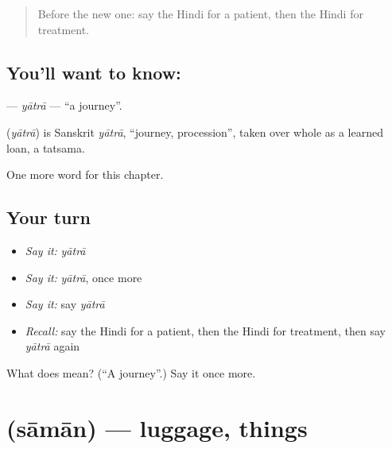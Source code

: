 \label{lesson:HI-C180-yatra}



\begin{quote}
Before the new one: say the Hindi for a patient, then the Hindi for treatment.
\end{quote}

\subsection*{You'll want to know: }
\textbf{} — \emph{yātrā} — \textquotedblleft{}a journey\textquotedblright{}.

\begin{cousinweb}
\textbf{} (\emph{yātrā}) is Sanskrit \emph{yātrā}, \textquotedblleft{}journey, procession\textquotedblright{}, taken over whole as a learned loan, a tatsama.
\end{cousinweb}

\begin{grammarlens}[title={What you've built}]
One more word for this chapter.
\end{grammarlens}

\subsection*{Your turn}
\begin{itemize}
\raggedright
  \item \emph{Say it:} \emph{yātrā}
  \item \emph{Say it:} \emph{yātrā}, once more
  \item \emph{Say it:} say \emph{yātrā}
  \item \emph{Recall:} say the Hindi for a patient, then the Hindi for treatment, then say \emph{yātrā} again
\end{itemize}

\begin{tcolorbox}[breakable,colback=teal!4,colframe=teal!35!black,title={Before you move on}]
What does  mean? (\textquotedblleft{}A journey\textquotedblright{}.) Say it once more.
\end{tcolorbox}
\section[\texorpdfstring{\hi{सामान} (sāmān)}{सामान (sāmān)}]{ (sāmān) — luggage, things}

\label{lesson:HI-C180-saman}



